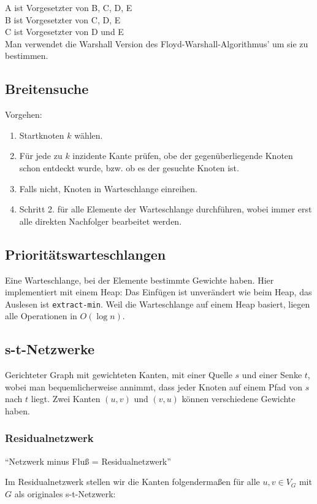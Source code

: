\documentclass[11pt]{scrartcl}
\begin{document}
A ist Vorgesetzter von B, C, D, E \\
B ist Vorgesetzter von C, D, E \\
C ist Vorgesetzter von D und E \\

Man verwendet die Warshall Version des Floyd-Warshall-Algorithmus' um sie zu bestimmen.

\subsection{Breitensuche}
Vorgehen:
\begin{enumerate}
\item Startknoten $k$ wählen.
\item Für jede zu $k$ inzidente Kante prüfen, obe der gegenüberliegende Knoten schon entdeckt wurde, bzw. ob es der gesuchte Knoten ist.
\item Falls nicht, Knoten in Warteschlange einreihen.
\item Schritt 2. für alle Elemente der Warteschlange durchführen, wobei immer erst alle direkten Nachfolger bearbeitet werden.
\end{enumerate}

\subsection{Prioritätswarteschlangen}

Eine Warteschlange, bei der Elemente bestimmte Gewichte haben. Hier implementiert mit einem Heap: Das Einfügen ist unverändert wie beim Heap, das Auslesen ist \texttt{extract-min}. Weil die Warteschlange auf einem Heap basiert, liegen alle Operationen in $O(\log n)$.

\subsection{s-t-Netzwerke}
Gerichteter Graph mit gewichteten Kanten, mit einer Quelle $s$ und einer Senke $t$, wobei man bequemlicherweise annimmt, dass jeder Knoten auf einem Pfad von $s$ nach $t$ liegt. Zwei Kanten $(u,v)$ und $(v,u)$ können verschiedene Gewichte haben.

\subsubsection{Residualnetzwerk}

``Netzwerk minus Fluß = Residualnetzwerk''

Im Residualnetzwerk stellen wir die Kanten folgendermaßen für alle $u,v \in V_G$ mit $G$ als originales s-t-Netzwerk:
\end{document}
